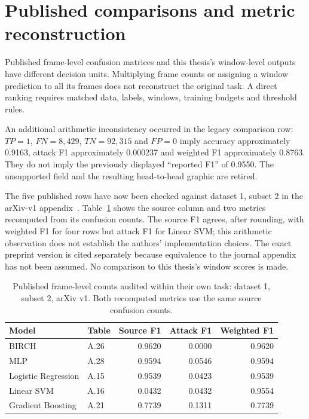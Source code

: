 \documentclass[12pt,a4paper,oneside,openany]{extbook}
\begin{document}
\section{Published comparisons and metric reconstruction}
Published frame-level confusion matrices and this thesis's window-level outputs have different decision units. Multiplying frame counts or assigning a window prediction to all its frames does not reconstruct the original task. A direct ranking requires matched data, labels, windows, training budgets and threshold rules.

An additional arithmetic inconsistency occurred in the legacy comparison row: $TP=1$, $FN=8{,}429$, $TN=92{,}315$ and $FP=0$ imply accuracy approximately 0.9163, attack F1 approximately 0.000237 and weighted F1 approximately 0.8763. They do not imply the previously displayed ``reported F1'' of 0.9550. The unsupported field and the resulting head-to-head graphic are retired.

The five published rows have now been checked against dataset 1, subset 2 in the arXiv-v1 appendix~\cite{lampe2023appendix}. Table~\ref{tab:published} shows the source column and two metrics recomputed from its confusion counts. The source F1 agrees, after rounding, with weighted F1 for four rows but attack F1 for Linear SVM; this arithmetic observation does not establish the authors' implementation choices. The exact preprint version is cited separately because equivalence to the journal appendix has not been assumed. No comparison to this thesis's window scores is made.

\begin{table}[htbp]\centering\small
\caption{Published frame-level counts audited within their own task: dataset 1, subset 2, arXiv v1. Both recomputed metrics use the same source confusion counts.}\label{tab:published}
\begin{tabular}{llrrr}\toprule
Model & Table & Source F1 & Attack F1 & Weighted F1\\\midrule

BIRCH & A.26 & 0.9620 & 0.0000 & 0.9620 \\
MLP & A.28 & 0.9594 & 0.0546 & 0.9594 \\
Logistic Regression & A.15 & 0.9539 & 0.0423 & 0.9539 \\
Linear SVM & A.16 & 0.0432 & 0.0432 & 0.9554 \\
Gradient Boosting & A.21 & 0.7739 & 0.1311 & 0.7739 \\
\bottomrule

\end{tabular}\end{table}
\FloatBarrier
\end{document}
